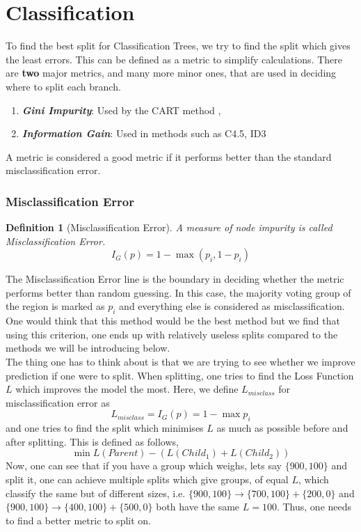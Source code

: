 \documentclass[11pt,a4paper]{report}
\newtheorem{definition}{Definition}
\begin{document}
\section{Classification}
To find the best split for Classification Trees, we try to find the split which gives the least errors. This can be defined as a metric to simplify calculations.
There are \textbf{two} major metrics, and many more minor ones, that are used in deciding where to split each branch.

\begin{enumerate}
    \item \textbf{\textit{Gini Impurity}}: Used by the CART method \cite{BreimanDT}, 
    
    \item \textbf{\textit{Information Gain}}: Used in methods such as C4.5, ID3 \cite{Quinlan}
\end{enumerate}
A metric is considered a good metric if it performs better than the standard misclassification error.
\subsubsection{Misclassification Error}
\begin{definition}[Misclassification Error]
A measure of node impurity is called Misclassification Error.
\begin{equation}
    I_G (p) = 1 - \max (p_i, 1 - p_i)
    \label{eq:misclassificationerror}
\end{equation}
\end{definition}
The Misclassification Error line is the boundary in deciding whether the metric performs better than random guessing.
In this case, the majority voting group of the region is marked as $p_i$ and everything else is considered as misclassification.
One would think that this method would be the best method but we find that using this criterion, one ends up with relatively useless splits compared to the methods we will be introducing below.
\medskip\\
The thing one has to think about is that we are trying to see whether we improve prediction if one were to split.
When splitting, one tries to find the Loss Function $L$ which improves the model the most. 
Here, we define $L_{misclass}$ for misclassification error as
\[
L_{misclass} = I_G (p) = 1 - \max p_i
\]
and one tries to find the split which minimises $L$ as much as possible before and after splitting.
This is defined as follows,
\[
\min L(Parent) - (L(Child_1) + L(Child_2))
\]
Now, one can see that if you have a group which weighs, lets say $\{900,100\}$ and split it, one can achieve multiple splits which give groups, of equal $L$, which classify the same but of different sizes, i.e. $\{900,100\} \rightarrow \{700,100\} + \{200,0\}$ and $\{900,100\} \rightarrow \{400,100\} + \{500,0\}$ both have the same $L = 100$.
Thus, one needs to find a better metric to split on.
\end{document}
